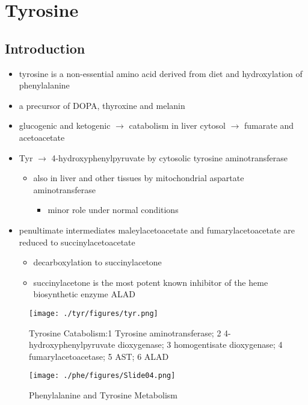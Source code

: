 \documentclass{scrartcl}
\begin{document}
\section{Tyrosine}
\label{sec:org746bd4a}
\subsection{Introduction}
\label{sec:orge666da0}

\begin{itemize}
\item tyrosine is a non-essential amino acid derived from diet and hydroxylation of phenylalanine
\item a precursor of DOPA, thyroxine and melanin
\item glucogenic and ketogenic \(\to\) catabolism in liver cytosol \(\to\) fumarate and acetoacetate
\item Tyr \(\to\) 4-hydroxyphenylpyruvate by cytosolic tyrosine aminotransferase
\begin{itemize}
\item also in liver and other tissues by mitochondrial aspartate aminotransferase
\begin{itemize}
\item minor role under normal conditions
\end{itemize}
\end{itemize}
\item penultimate intermediates maleylacetoacetate and fumarylacetoacetate
are reduced to succinylacetoacetate
\begin{itemize}
\item decarboxylation to succinylacetone
\item succinylacetone is the most potent known inhibitor of the heme biosynthetic enzyme ALAD
\end{itemize}
\end{itemize}

\begin{figure}[htbp]
\centering
\texttt{[image: ./tyr/figures/tyr.png]}
\caption{\label{fig:org358a30e}
Tyrosine Catabolism:1 Tyrosine aminotransferase; 2 4-hydroxyphenylpyruvate dioxygenase; 3 homogentisate dioxygenase; 4 fumarylacetoacetase; 5 AST; 6 ALAD}
\end{figure}


\begin{figure}[htbp]
\centering
\texttt{[image: ./phe/figures/Slide04.png]}
\caption{\label{fig:orgde94068}
Phenylalanine and Tyrosine Metabolism}
\end{figure}
\end{document}
